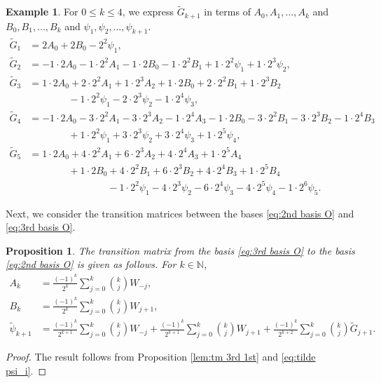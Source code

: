 \documentclass[11pt]{article}%
\theoremstyle{definition}
\newtheorem{example}[definition]{Example}
\theoremstyle{plain}
\newtheorem{proposition}[definition]{Proposition}
\begin{document}
\begin{example}\label{ex:tm_3rd_1st, psi_k}
For $0 \leq k \leq 4$, we express $\tilde G_{k+1}$ in terms of $A_0, A_1, \ldots, A_k$ and $B_0, B_1, \ldots, B_{k}$ and $\psi_1, \psi_2, \ldots, \psi_{k+1}$.
\begin{align*}
	\tilde G_1 & = 2A_0 + 2B_0 - 2^2 \psi_1, \\[2pt]
	\tilde G_2 & = -1\cdot 2A_0 - 1 \cdot 2^2 A_1 - 1\cdot 2 B_0 - 1\cdot 2^2 B_1 + 1\cdot 2^2 \psi_1 + 1\cdot 2^3 \psi_2, \\[2pt]
	\tilde G_3 & = 1\cdot 2 A_0 + 2\cdot2^2 A_1 + 1\cdot 2^3 A_2 
			+ 1 \cdot 2 B_0 + 2 \cdot 2^2 B_1 + 1 \cdot 2^3 B_2 \\[2pt]
	& \qquad \qquad - 1 \cdot 2^2 \psi_1 - 2 \cdot 2^3 \psi_2 - 1 \cdot 2^4 \psi_3, \\[2pt]
	\tilde G_4 & = -1 \cdot 2 A_0 - 3 \cdot 2^2 A_1 - 3 \cdot 2^3 A_2 - 1 \cdot 2^4 A_3
			- 1 \cdot 2 B_0 - 3 \cdot 2^2 B_1 - 3 \cdot 2^3 B_2 - 1\cdot 2^4 B_3 \\[2pt]
	& \qquad \qquad	
			+ 1 \cdot 2^2 \psi_1 + 3 \cdot 2^3 \psi_2 + 3 \cdot 2^4 \psi_3 + 1\cdot 2^5 \psi_4, \\[2pt]
	\tilde G_5 & = 1 \cdot 2 A_0 + 4 \cdot 2^2 A_1 + 6 \cdot 2^3 A_2 + 4 \cdot 2^4 A_3 + 1 \cdot 2^5 A_4 \\[2pt]
			& \qquad \qquad + 1 \cdot 2 B_0 + 4 \cdot 2^2 B_1 + 6 \cdot 2^3 B_2 + 4 \cdot 2^4 B_3 + 1 \cdot 2^5 B_4\\[2pt]
	& \qquad \qquad \qquad \qquad
			- 1 \cdot 2^2 \psi_1 - 4 \cdot 2^3 \psi_2 - 6 \cdot 2^4 \psi_3 - 4 \cdot 2^5 \psi_4 - 1 \cdot 2^6 \psi_5.
\end{align*}
\end{example}

Next, we consider the transition matrices between the bases \eqref{eq:2nd basis O} and \eqref{eq:3rd basis O}.

\begin{proposition}\label{lem:tm 3rd 2nd}
The transition matrix from the basis \eqref{eq:3rd basis O} to the basis \eqref{eq:2nd basis O} is given as follows.
For $k \in \mathbb{N}$,
\begin{align*}
	A_k  & = \frac{(-1)^k}{2^k} \sum_{j=0}^k {k \choose j} W_{-j}, \\
	B_k  & = \frac{(-1)^k}{2^k} \sum_{j=0}^k {k \choose j} W_{j+1}, \\
	\tilde\psi_{k+1}  
		& = 	\frac{(-1)^k}{2^{k+1}} \sum_{j=0}^k {k \choose j} W_{-j}
			+ \frac{(-1)^k}{2^{k+1}} \sum_{j=0}^k {k \choose j} W_{j+1}
			+ \frac{(-1)^k}{2^{k+2}} \sum_{j=0}^k {k \choose j} \tilde{G}_{j+1}.
\end{align*}
\end{proposition}
\begin{proof}
The result follows from Proposition \ref{lem:tm 3rd 1st} and \eqref{eq:tilde psi_i}.
\end{proof}
\end{document}
